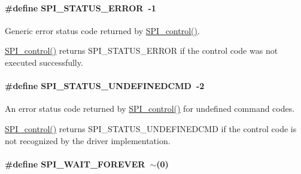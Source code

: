 \paragraph[{S\+P\+I\+\_\+\+S\+T\+A\+T\+U\+S\+\_\+\+E\+R\+R\+O\+R}]{\setlength{\rightskip}{0pt plus 5cm}\#define S\+P\+I\+\_\+\+S\+T\+A\+T\+U\+S\+\_\+\+E\+R\+R\+O\+R~-\/1}\label{_s_p_i_8h_a2d0020dd673cc28a9e1c20b0ff101073}


Generic error status code returned by \hyperlink{_s_p_i_8h_ab9d3a23991be2741f382749d3844cc2f}{S\+P\+I\+\_\+control()}. 

\hyperlink{_s_p_i_8h_ab9d3a23991be2741f382749d3844cc2f}{S\+P\+I\+\_\+control()} returns S\+P\+I\+\_\+\+S\+T\+A\+T\+U\+S\+\_\+\+E\+R\+R\+O\+R if the control code was not executed successfully. 
\paragraph[{S\+P\+I\+\_\+\+S\+T\+A\+T\+U\+S\+\_\+\+U\+N\+D\+E\+F\+I\+N\+E\+D\+C\+M\+D}]{\setlength{\rightskip}{0pt plus 5cm}\#define S\+P\+I\+\_\+\+S\+T\+A\+T\+U\+S\+\_\+\+U\+N\+D\+E\+F\+I\+N\+E\+D\+C\+M\+D~-\/2}\label{_s_p_i_8h_acfcd15e1eecdb99b4867adc7592a8d6e}


An error status code returned by \hyperlink{_s_p_i_8h_ab9d3a23991be2741f382749d3844cc2f}{S\+P\+I\+\_\+control()} for undefined command codes. 

\hyperlink{_s_p_i_8h_ab9d3a23991be2741f382749d3844cc2f}{S\+P\+I\+\_\+control()} returns S\+P\+I\+\_\+\+S\+T\+A\+T\+U\+S\+\_\+\+U\+N\+D\+E\+F\+I\+N\+E\+D\+C\+M\+D if the control code is not recognized by the driver implementation. 
\paragraph[{S\+P\+I\+\_\+\+W\+A\+I\+T\+\_\+\+F\+O\+R\+E\+V\+E\+R}]{\setlength{\rightskip}{0pt plus 5cm}\#define S\+P\+I\+\_\+\+W\+A\+I\+T\+\_\+\+F\+O\+R\+E\+V\+E\+R~$\sim$(0)}\label{_s_p_i_8h_a7cab73b936e6e08392882196df41277e}


